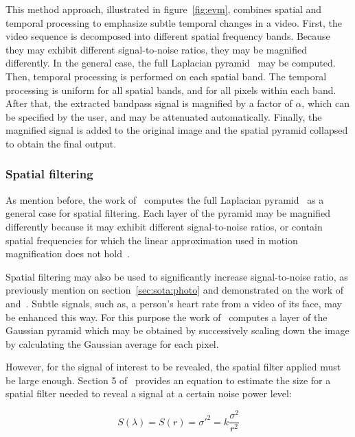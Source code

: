 This method approach, illustrated in figure~\ref{fig:evm}, combines
spatial and temporal processing to emphasize subtle temporal changes
in a video. First, the video sequence is decomposed into different
spatial frequency bands. Because they may exhibit different
signal-to-noise ratios, they may be magnified differently.
In the general case, the full Laplacian pyramid~\cite{Burt1983Laplacian}
may be computed. Then, temporal processing is performed on each
spatial band. The temporal processing is uniform for all spatial
bands, and for all pixels within each band. After that, the extracted
bandpass signal is magnified by a factor of $\alpha$, which can be
specified by the user, and may be attenuated automatically. Finally,
the magnified signal is added to the original image and the spatial pyramid
collapsed to obtain the final output.

\subsubsection{Spatial filtering} \label{sec:sota:post:evm:spatial}

As mention before, the work of~\cite{Wu2012Eulerian} computes the full
Laplacian pyramid~\cite{Burt1983Laplacian} as a general case for spatial
filtering. Each layer of the pyramid may be magnified differently because
it may exhibit different signal-to-noise ratios, or contain spatial frequencies
for which the linear approximation used in motion magnification does not
hold~\cite[Section 3]{Wu2012Eulerian}.

Spatial filtering may also be used to significantly increase signal-to-noise
ratio, as previously mention on section~\ref{sec:sota:photo} and demonstrated
on the work of~\cite{Verkruysse2008Remote} and~\cite{Wu2012Eulerian}. Subtle
signals, such as, a person's heart rate from a video of its face, may be
enhanced this way. For this purpose the work of~\cite{Wu2012Eulerian} computes
a layer of the Gaussian pyramid which may be obtained by successively scaling
down the image by calculating the Gaussian average for each pixel.

However, for the signal of interest to be revealed, the spatial filter applied
must be large enough. Section 5 of~\cite{Wu2012Eulerian} provides an equation
to estimate the size for a spatial filter needed to reveal a signal at a
certain noise power level:

\begin{equation}
  S(\lambda) = S(r) = \sigma'^2 = k \frac{\sigma^2}{r^2}
\end{equation}

